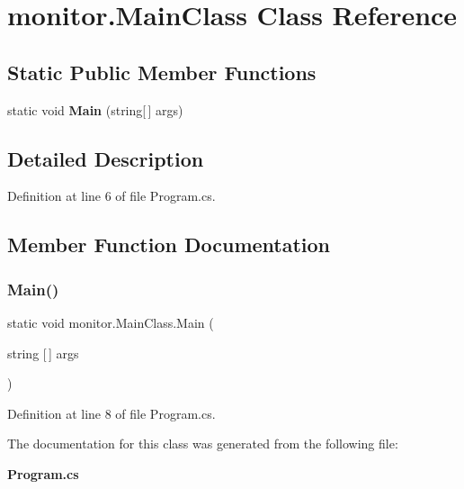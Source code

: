 \section{monitor.\+Main\+Class Class Reference}
\label{classmonitor_1_1_main_class}
\subsection*{Static Public Member Functions}
\begin{DoxyCompactItemize}
\item 
static void \textbf{ Main} (string[$\,$] args)
\end{DoxyCompactItemize}


\subsection{Detailed Description}


Definition at line 6 of file Program.\+cs.



\subsection{Member Function Documentation}
\mbox{\label{classmonitor_1_1_main_class_a991579f985cc4071757b30a8b035e7c1}} 
\subsubsection{Main()}
{\footnotesize\ttfamily static void monitor.\+Main\+Class.\+Main (\begin{DoxyParamCaption}\item[{string [$\,$]}]{args }\end{DoxyParamCaption})\hspace{0.3cm}{\ttfamily [static]}}



Definition at line 8 of file Program.\+cs.



The documentation for this class was generated from the following file\+:\begin{DoxyCompactItemize}
\item 
\textbf{ Program.\+cs}\end{DoxyCompactItemize}
